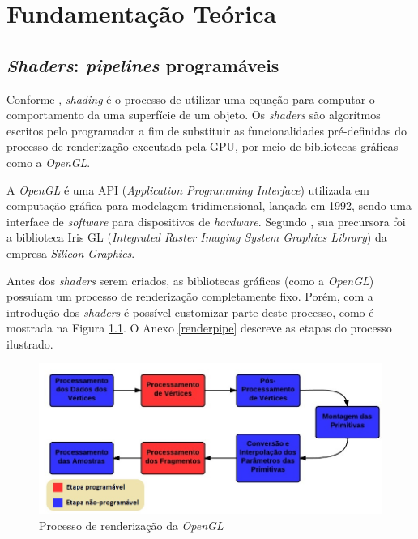 \chapter[Fundamentação Teórica]{Fundamentação Teórica}
\label{refteorico}

\section{\textit{Shaders}: \textit{pipelines} programáveis}

	Conforme \cite{realtime}, \textit{shading} é o processo de utilizar uma equação para computar o comportamento da uma superfície de um objeto. Os \textit{shaders} são algorítmos escritos pelo programador a fim de substituir as funcionalidades pré-definidas do processo de renderização executada pela GPU, por meio de bibliotecas gráficas como a \textit{OpenGL}.

	 A \textit{OpenGL} é uma API (\textit{Application Programming Interface}) utilizada em computação gráfica para modelagem tridimensional, lançada em 1992, sendo uma interface de \textit{software} para dispositivos de \textit{hardware}. Segundo \cite{opengl2011}, sua precursora foi a biblioteca Iris GL (\textit{Integrated Raster Imaging System Graphics Library}) da empresa \textit{Silicon Graphics}.

	Antes dos \textit{shaders} serem criados, as bibliotecas gráficas (como a \textit{OpenGL}) possuíam um processo de renderização completamente fixo. Porém, com a introdução dos \textit{shaders} é possível customizar parte deste processo, como é  mostrada na Figura \ref{pipeline}. O Anexo \ref{renderpipe} descreve as etapas do processo ilustrado.
	\begin{figure}[ht]
	\centering
		\includegraphics[keepaspectratio=true,scale=0.5]{figuras/pipeline.jpg}
	\caption{Processo de renderização da \textit{OpenGL}}
	\label{pipeline}
	\end{figure}

